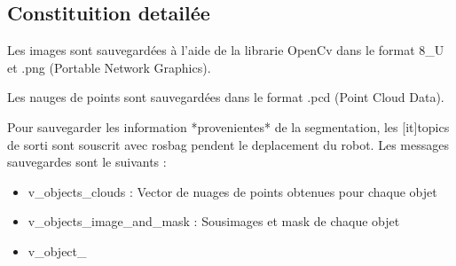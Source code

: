 \subsection{Constituition detailée}

Les images sont sauvegardées à l'aide de la librarie OpenCv dans le format 8\_U et .png (Portable Network Graphics).

Les nauges de points sont sauvegardées dans le format .pcd (Point Cloud Data).

Pour sauvegarder les information *provenientes* de la segmentation, les [it]topics de sorti sont souscrit avec rosbag pendent le deplacement du robot. Les messages sauvegardes sont le suivants :

\begin{itemize}
\item v\_objects\_clouds : Vector de nuages de points obtenues pour chaque objet 

\item v\_objects\_image\_and\_mask : Sousimages et mask de chaque objet

\item v\_object\_

\end{itemize}


